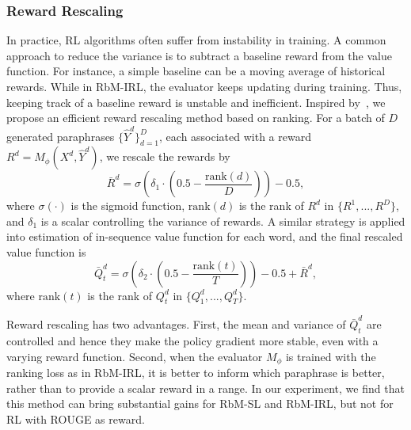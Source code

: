 \documentclass[11pt,a4paper]{article}
\newcommand{\MP}{M_{\phi}}
\begin{document}
    \subsubsection*{Reward Rescaling}\label{sec:reward-rescale}
    In practice, RL algorithms often suffer from instability in training. A common approach to reduce the variance is to subtract a baseline reward from the value function. For instance, a simple baseline can be a moving average of historical rewards. %
    While in RbM-IRL, the evaluator keeps updating during training. Thus, keeping track of a baseline reward is unstable and inefficient. Inspired by~\citet{guo2017long}, we propose an efficient reward rescaling method based on ranking. For a batch of $D$ generated paraphrases $\{\hat{Y}^{d}\}_{d=1}^D$, each associated with a reward $R^{d}=\MP(X^d, \hat{Y}^d)$, we rescale the rewards by
        \begin{equation}\label{eqn:rescale-1}
            \bar{R}^d = \sigma(\delta_1 \cdot (0.5-\frac{\text{rank}(d)}{D})) - 0.5,
        \end{equation}
    where $\sigma(\mathord{\cdot})$ is the sigmoid function, $\text{rank}(d)$ is the rank of $R^{d}$ in $\{R^{1},...,R^{D}\}$, and $\delta_1$ is a scalar controlling the variance of rewards. A similar strategy is applied into estimation of in-sequence value function for each word, and the final rescaled value function is
        \begin{equation}\label{eqn:rescale-2}
            \bar{Q}^d_t = \sigma(\delta_2 \cdot (0.5-\frac{\text{rank}(t)}{T})) - 0.5 + \bar{R}^d,
        \end{equation}
    where $\text{rank}(t)$ is the rank of $Q^{d}_t$ in $\{Q^{d}_1,...,Q^{d}_T\}$.

    Reward rescaling has two advantages. First, the mean and variance of $\bar{Q}_t^d$ are controlled and hence they make the policy gradient more stable, even with a varying reward function. Second, when the evaluator $\MP$ is trained with the ranking loss as in RbM-IRL, it is better to inform which paraphrase is better, rather than to provide a scalar reward in a range. In our experiment, we find that this method can bring substantial gains for RbM-SL and RbM-IRL, but not for RL with ROUGE as reward.
\end{document}
